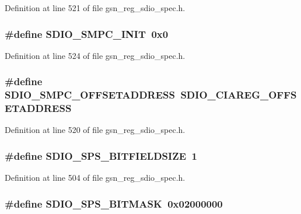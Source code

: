 Definition at line 521 of file gsn\_\-reg\_\-sdio\_\-spec.h.

\hypertarget{a00571_aee30b6caab7b4c152c5682e1fe2f9b6d}{
\subsubsection[{SDIO\_\-SMPC\_\-INIT}]{\setlength{\rightskip}{0pt plus 5cm}\#define SDIO\_\-SMPC\_\-INIT~0x0}}
\label{a00571_aee30b6caab7b4c152c5682e1fe2f9b6d}


Definition at line 524 of file gsn\_\-reg\_\-sdio\_\-spec.h.

\hypertarget{a00571_a64e3f4662d9474a4cecfab8d6833909a}{
\subsubsection[{SDIO\_\-SMPC\_\-OFFSETADDRESS}]{\setlength{\rightskip}{0pt plus 5cm}\#define SDIO\_\-SMPC\_\-OFFSETADDRESS~SDIO\_\-CIAREG\_\-OFFSETADDRESS}}
\label{a00571_a64e3f4662d9474a4cecfab8d6833909a}


Definition at line 520 of file gsn\_\-reg\_\-sdio\_\-spec.h.

\hypertarget{a00571_a16277cab4a073132a78694cc098ffe8f}{
\subsubsection[{SDIO\_\-SPS\_\-BITFIELDSIZE}]{\setlength{\rightskip}{0pt plus 5cm}\#define SDIO\_\-SPS\_\-BITFIELDSIZE~1}}
\label{a00571_a16277cab4a073132a78694cc098ffe8f}


Definition at line 504 of file gsn\_\-reg\_\-sdio\_\-spec.h.

\hypertarget{a00571_a5bcad6685665fa424925c3234dfaa4a7}{
\subsubsection[{SDIO\_\-SPS\_\-BITMASK}]{\setlength{\rightskip}{0pt plus 5cm}\#define SDIO\_\-SPS\_\-BITMASK~0x02000000}}
\label{a00571_a5bcad6685665fa424925c3234dfaa4a7}


